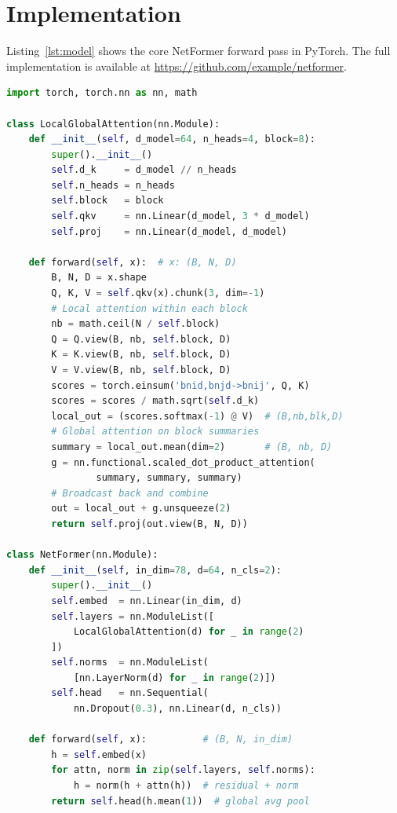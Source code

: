 \documentclass[conference]{IEEEtran}
\begin{document}
\section{Implementation}
\label{sec:impl}

Listing~\ref{lst:model} shows the core NetFormer forward pass in
PyTorch. The full implementation is available at
\url{https://github.com/example/netformer}.

\begin{lstlisting}[language=Python, caption={NetFormer forward pass
  (PyTorch, simplified).}, label={lst:model}]
import torch, torch.nn as nn, math

class LocalGlobalAttention(nn.Module):
    def __init__(self, d_model=64, n_heads=4, block=8):
        super().__init__()
        self.d_k     = d_model // n_heads
        self.n_heads = n_heads
        self.block   = block
        self.qkv     = nn.Linear(d_model, 3 * d_model)
        self.proj    = nn.Linear(d_model, d_model)

    def forward(self, x):  # x: (B, N, D)
        B, N, D = x.shape
        Q, K, V = self.qkv(x).chunk(3, dim=-1)
        # Local attention within each block
        nb = math.ceil(N / self.block)
        Q = Q.view(B, nb, self.block, D)
        K = K.view(B, nb, self.block, D)
        V = V.view(B, nb, self.block, D)
        scores = torch.einsum('bnid,bnjd->bnij', Q, K)
        scores = scores / math.sqrt(self.d_k)
        local_out = (scores.softmax(-1) @ V)  # (B,nb,blk,D)
        # Global attention on block summaries
        summary = local_out.mean(dim=2)       # (B, nb, D)
        g = nn.functional.scaled_dot_product_attention(
                summary, summary, summary)
        # Broadcast back and combine
        out = local_out + g.unsqueeze(2)
        return self.proj(out.view(B, N, D))

class NetFormer(nn.Module):
    def __init__(self, in_dim=78, d=64, n_cls=2):
        super().__init__()
        self.embed  = nn.Linear(in_dim, d)
        self.layers = nn.ModuleList([
            LocalGlobalAttention(d) for _ in range(2)
        ])
        self.norms  = nn.ModuleList(
            [nn.LayerNorm(d) for _ in range(2)])
        self.head   = nn.Sequential(
            nn.Dropout(0.3), nn.Linear(d, n_cls))

    def forward(self, x):          # (B, N, in_dim)
        h = self.embed(x)
        for attn, norm in zip(self.layers, self.norms):
            h = norm(h + attn(h))  # residual + norm
        return self.head(h.mean(1))  # global avg pool
\end{lstlisting}
\end{document}
